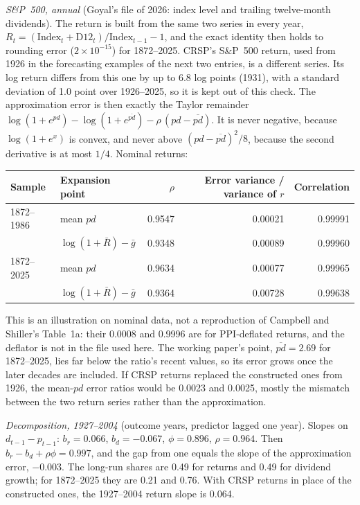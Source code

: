 \begin{qfresult}
 \emph{S\&P~500, annual} (Goyal's file of 2026: index level and trailing twelve-month dividends). The return is built from the same two series in every year, $R_t=(\text{Index}_t+\text{D12}_t)/\text{Index}_{t-1}-1$, and the exact identity then holds to rounding error ($2\times10^{-15}$) for 1872--2025. CRSP's S\&P~500 return, used from 1926 in the forecasting examples of the next two entries, is a different series. Its log return differs from this one by up to 6.8 log points (1931), with a standard deviation of 1.0 point over 1926--2025, so it is kept out of this check. The approximation error is then exactly the Taylor remainder $\log(1+e^{pd})-\log(1+e^{\overline{pd}})-\rho\,(pd-\overline{pd})$. It is never negative, because $\log(1+e^{x})$ is convex, and never above $(pd-\overline{pd})^2/8$, because the second derivative is at most $1/4$. Nominal returns:
\begin{center}\small
\begin{tabular}{@{}llrrr@{}}
\toprule
Sample & Expansion point & $\rho$ & Error variance / variance of $r$ & Correlation \\
\midrule
1872--1986 & mean $pd$ & 0.9547 & 0.00021 & 0.99991 \\
 & $\log(1+\bar R)-\bar g$ & 0.9348 & 0.00089 & 0.99960 \\
1872--2025 & mean $pd$ & 0.9634 & 0.00077 & 0.99965 \\
 & $\log(1+\bar R)-\bar g$ & 0.9364 & 0.00728 & 0.99638 \\
\bottomrule
\end{tabular}
\end{center}
This is an illustration on nominal data, not a reproduction of Campbell and Shiller's Table~1a: their 0.0008 and 0.9996 are for PPI-deflated returns, and the deflator is not in the file used here. The working paper's point, $\overline{pd}=2.69$ for 1872--2025, lies far below the ratio's recent values, so its error grows once the later decades are included. If CRSP returns replaced the constructed ones from 1926, the mean-$pd$ error ratios would be 0.0023 and 0.0025, mostly the mismatch between the two return series rather than the approximation.

\emph{Decomposition, 1927--2004} (outcome years, predictor lagged one year). Slopes on $d_{t-1}-p_{t-1}$: $b_r=0.066$, $b_d=-0.067$, $\phi=0.896$, $\rho=0.964$. Then $b_r-b_d+\rho\phi=0.997$, and the gap from one equals the slope of the approximation error, $-0.003$. The long-run shares are 0.49 for returns and 0.49 for dividend growth; for 1872--2025 they are 0.21 and 0.76. With CRSP returns in place of the constructed ones, the 1927--2004 return slope is 0.064.


\end{qfresult}
